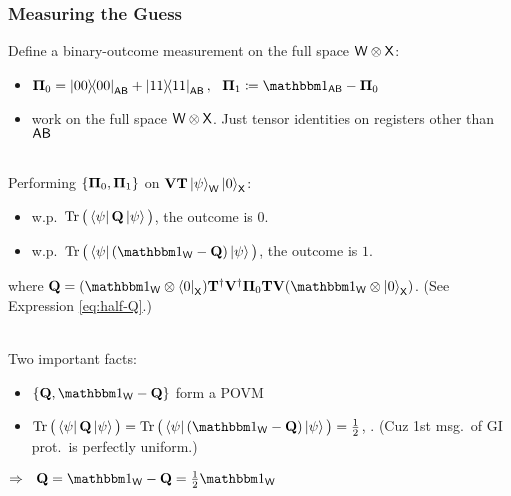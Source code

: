 \documentclass[aspectratio=1610, 12pt, xcolor={dvipsnames}]{beamer}
\begin{document}
\begin{frame}
\frametitle{Measuring the Guess}

Define a binary-outcome measurement on the full space $\reg{w}\tensor\reg{x}$: 
\begin{itemize}
\item $\vb{\Pi}_0 = \ketbra{00}_\reg{ab} + \ketbra{11}_\reg{ab}, ~~\vb{\Pi}_1 \coloneqq \idm_\reg{ab} - \vb{\Pi}_0$
\item 
work on the full space $\reg{w}\tensor\reg{x}$. Just tensor identities on registers other than $\reg{ab}$
\end{itemize}
~\\


Performing $\{\vb{\Pi}_0, \vb{\Pi}_1\}$ on $\vb{V}\vb{T}\ket{\psi}_\reg{w}\ket{0}_\reg{x}$:
\begin{itemize}
\item w.p.\ 
$\Tr\big(\bra{\psi}\vb{Q} \ket{\psi}\big)$, the outcome is $0$.
\item w.p.\  
$\Tr\big(\bra{\psi}( \idm_\reg{w}- \vb{Q} )\ket{\psi}\big)$, the outcome is $1$.
\end{itemize}
where $\vb{Q}	 = (\idm_\reg{w} \tensor \bra{0}_\reg{x}) \vb{T}^\dagger \vb{V}^\dagger \vb{\Pi}_0 \vb{T} \vb{V} (\idm_\reg{w} \tensor \ket{0}_\reg{x})$. (See Expression \eqref{eq:half-Q}.)
\\~

Two important facts:
\begin{itemize}
\item $\Set{\vb{Q}, \idm_\reg{w}- \vb{Q}}$ form a POVM
\item
$\Tr\big(\bra{\psi}\vb{Q} \ket{\psi}\big) = \Tr\big(\bra{\psi}( \idm_\reg{w}- \vb{Q} )\ket{\psi}\big) = \frac{1}{2}$, . (Cuz 1st msg.\ of GI prot.\ is perfectly uniform.)
\end{itemize}
$\Rightarrow ~~ \vb{Q}  = \idm_\reg{w}- \vb{Q} = \frac{1}{2}\idm_\reg{w}$
\end{frame}
\end{document}
